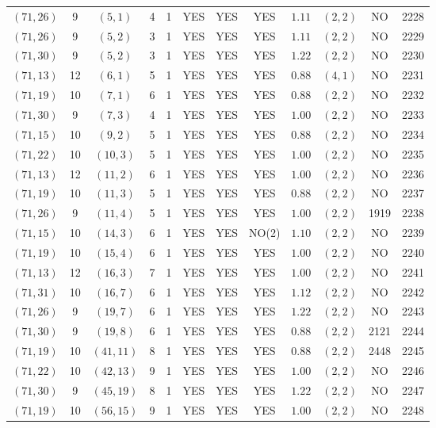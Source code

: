 \begin{longtable}{|c|c|c|c|c|c|c|c|c|c|c|c|}
$(71,26)$ & 9 & $(5,1)$ & 4 & 1 & YES & YES & YES & $1.11$ & $(2,2)$ & NO & 2228\\
$(71,26)$ & 9 & $(5,2)$ & 3 & 1 & YES & YES & YES & $1.11$ & $(2,2)$ & NO & 2229\\
$(71,30)$ & 9 & $(5,2)$ & 3 & 1 & YES & YES & YES & $1.22$ & $(2,2)$ & NO & 2230\\
$(71,13)$ & 12 & $(6,1)$ & 5 & 1 & YES & YES & YES & $0.88$ & $(4,1)$ & NO & 2231\\
$(71,19)$ & 10 & $(7,1)$ & 6 & 1 & YES & YES & YES & $0.88$ & $(2,2)$ & NO & 2232\\
$(71,30)$ & 9 & $(7,3)$ & 4 & 1 & YES & YES & YES & $1.00$ & $(2,2)$ & NO & 2233\\
$(71,15)$ & 10 & $(9,2)$ & 5 & 1 & YES & YES & YES & $0.88$ & $(2,2)$ & NO & 2234\\
$(71,22)$ & 10 & $(10,3)$ & 5 & 1 & YES & YES & YES & $1.00$ & $(2,2)$ & NO & 2235\\
$(71,13)$ & 12 & $(11,2)$ & 6 & 1 & YES & YES & YES & $1.00$ & $(2,2)$ & NO & 2236\\
$(71,19)$ & 10 & $(11,3)$ & 5 & 1 & YES & YES & YES & $0.88$ & $(2,2)$ & NO & 2237\\
$(71,26)$ & 9 & $(11,4)$ & 5 & 1 & YES & YES & YES & $1.00$ & $(2,2)$ & 1919 & 2238\\
$(71,15)$ & 10 & $(14,3)$ & 6 & 1 & YES & YES & NO(2) & $1.10$ & $(2,2)$ & NO & 2239\\
$(71,19)$ & 10 & $(15,4)$ & 6 & 1 & YES & YES & YES & $1.00$ & $(2,2)$ & NO & 2240\\
$(71,13)$ & 12 & $(16,3)$ & 7 & 1 & YES & YES & YES & $1.00$ & $(2,2)$ & NO & 2241\\
$(71,31)$ & 10 & $(16,7)$ & 6 & 1 & YES & YES & YES & $1.12$ & $(2,2)$ & NO & 2242\\
$(71,26)$ & 9 & $(19,7)$ & 6 & 1 & YES & YES & YES & $1.22$ & $(2,2)$ & NO & 2243\\
$(71,30)$ & 9 & $(19,8)$ & 6 & 1 & YES & YES & YES & $0.88$ & $(2,2)$ & 2121 & 2244\\
$(71,19)$ & 10 & $(41,11)$ & 8 & 1 & YES & YES & YES & $0.88$ & $(2,2)$ & 2448 & 2245\\
$(71,22)$ & 10 & $(42,13)$ & 9 & 1 & YES & YES & YES & $1.00$ & $(2,2)$ & NO & 2246\\
$(71,30)$ & 9 & $(45,19)$ & 8 & 1 & YES & YES & YES & $1.22$ & $(2,2)$ & NO & 2247\\
$(71,19)$ & 10 & $(56,15)$ & 9 & 1 & YES & YES & YES & $1.00$ & $(2,2)$ & NO & 2248\\

\end{longtable}
